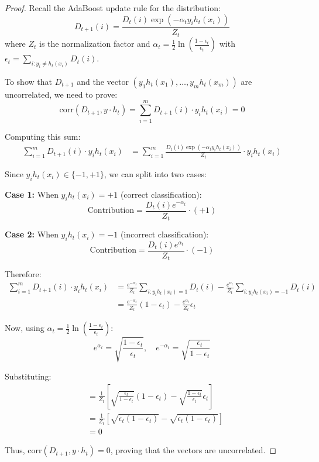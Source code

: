 \documentclass[letterpaper, 11pt]{article}
\newcommand{\1}{\mathds{1}}	%
\theoremstyle{definition}
\begin{document}
\begin{proof}
Recall the AdaBoost update rule for the distribution:
\[
D_{t+1}(i) = \frac{D_t(i) \exp(-\alpha_t y_i h_t(x_i))}{Z_t}
\]
where $Z_t$ is the normalization factor and $\alpha_t = \frac{1}{2} \ln\left(\frac{1-\epsilon_t}{\epsilon_t}\right)$ with $\epsilon_t = \sum_{i: y_i \neq h_t(x_i)} D_t(i)$.

To show that $D_{t+1}$ and the vector $(y_1 h_t(x_1), \ldots, y_m h_t(x_m))$ are uncorrelated, we need to prove:
\[
\text{corr}(D_{t+1}, y \cdot h_t) = \sum_{i=1}^{m} D_{t+1}(i) \cdot y_i h_t(x_i) = 0
\]

Computing this sum:
\begin{align*}
\sum_{i=1}^{m} D_{t+1}(i) \cdot y_i h_t(x_i) &= \sum_{i=1}^{m} \frac{D_t(i) \exp(-\alpha_t y_i h_t(x_i))}{Z_t} \cdot y_i h_t(x_i)
\end{align*}

Since $y_i h_t(x_i) \in \{-1, +1\}$, we can split into two cases:

\textbf{Case 1:} When $y_i h_t(x_i) = +1$ (correct classification):
\[
\text{Contribution} = \frac{D_t(i) e^{-\alpha_t}}{Z_t} \cdot (+1)
\]

\textbf{Case 2:} When $y_i h_t(x_i) = -1$ (incorrect classification):
\[
\text{Contribution} = \frac{D_t(i) e^{\alpha_t}}{Z_t} \cdot (-1)
\]

Therefore:
\begin{align*}
\sum_{i=1}^{m} D_{t+1}(i) \cdot y_i h_t(x_i) &= \frac{e^{-\alpha_t}}{Z_t} \sum_{i: y_i h_t(x_i) = 1} D_t(i) - \frac{e^{\alpha_t}}{Z_t} \sum_{i: y_i h_t(x_i) = -1} D_t(i) \\
&= \frac{e^{-\alpha_t}}{Z_t} (1 - \epsilon_t) - \frac{e^{\alpha_t}}{Z_t} \epsilon_t
\end{align*}

Now, using $\alpha_t = \frac{1}{2} \ln\left(\frac{1-\epsilon_t}{\epsilon_t}\right)$:
\[
e^{\alpha_t} = \sqrt{\frac{1-\epsilon_t}{\epsilon_t}}, \quad e^{-\alpha_t} = \sqrt{\frac{\epsilon_t}{1-\epsilon_t}}
\]

Substituting:
\begin{align*}
&= \frac{1}{Z_t} \left[ \sqrt{\frac{\epsilon_t}{1-\epsilon_t}} (1-\epsilon_t) - \sqrt{\frac{1-\epsilon_t}{\epsilon_t}} \epsilon_t \right] \\
&= \frac{1}{Z_t} \left[ \sqrt{\epsilon_t(1-\epsilon_t)} - \sqrt{\epsilon_t(1-\epsilon_t)} \right] \\
&= 0
\end{align*}

Thus, $\text{corr}(D_{t+1}, y \cdot h_t) = 0$, proving that the vectors are uncorrelated.
\end{proof}
\end{document}
